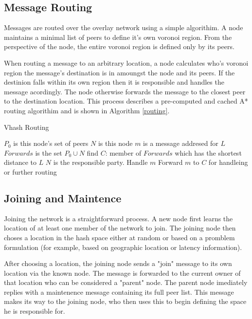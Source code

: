\documentclass[11pt]{IEEEtran} %
\begin{document}
\subsection{Message Routing}
Messages are routed over the overlay network using a simple algorithim. A node maintains a minimal list of peers to define it's own voronoi region.  From the perspective of the node, the entire voronoi region is defined only by its peers.

When routing a message to an arbitrary location, a node calculates who's voronoi region the message's destination is in amoungst the node and its peers. If the destinion falls within its own region then it is responsible and handles the message acordingly. The node otherwise forwards the message to the closest peer to the destination location. This process describes a pre-computed and cached A* \cite{astar} routing algorithim and is shown in Algorithm \ref{routing}. 

\begin{algorithm}
\caption{Vhash Routing}
\label{routing}
\begin{algorithmic}[1]  %
	\STATE $P_0$ is this node's set of peers
    \STATE $N$ is this node
	\STATE $m$ is a message addresed for $L$
    \STATE $Forwards$ is the set $P_0\cup{}N$
    \STATE find $C$: member of $Forwards$ which has the shortest distance to $L$
    	\STATE $N$ is the responsible party.
        \STATE Handle $m$
    \ELSE
    	\STATE Forward $m$ to $C$ for handleing or further routing
    \ENDIF
\end{algorithmic}
\end{algorithm}

\subsection{Joining and Maintence}
Joining the network is a straightforward process. A new node first learns the location of at least one member of the network to join. The joining node then choses a location in the hash space either at random or based on a promblem formulation (for example, based on geographic location or latency information).

After choosing a location, the joining node sends a "join" message to its own location via the known node.
The message is forwarded to the current owner of that location who can be considered a "parent" node.
The parent node imediately replies with a maintenence message containing its full peer list. This message makes its way to the joining node, who then uses this to begin defining the space he is responsible for. 
\end{document}
